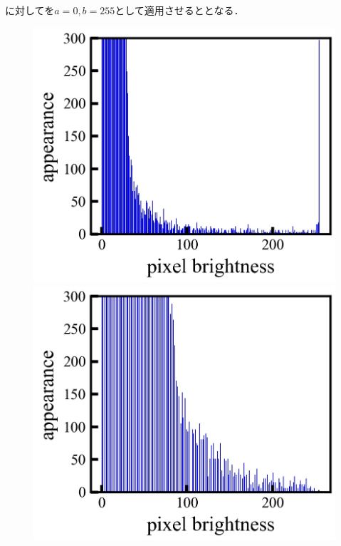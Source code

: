 に対してを$a=0,b=255$として適用させるととなる．
\begin{figure}[h]
	\begin{center}
		\begin{minipage}{0.3\linewidth}
			\includegraphics[width=0.98\columnwidth]{./theory/figure/5/norm_hist_0.jpg}
		\end{minipage}
		\begin{minipage}{0.3\linewidth}
			\includegraphics[width=0.98\columnwidth]{./theory/figure/5/norm_hist_2.jpg}
		\end{minipage}

\end{center}
\end{figure}
